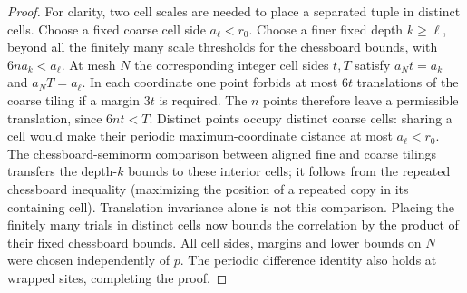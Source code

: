 \begin{proof}
For clarity, two cell scales are needed to place a separated tuple in distinct cells.
Choose a fixed coarse cell side $a_\ell<r_0$.
Choose a finer fixed depth $k\ge\ell$, beyond all the finitely many
scale thresholds for the chessboard bounds, with $6na_k<a_\ell$.
At mesh $N$ the corresponding integer cell sides $t,T$ satisfy
$a_Nt=a_k$ and $a_NT=a_\ell$.
In each coordinate one point forbids at most $6t$ translations
of the coarse tiling if a margin $3t$ is required.
The $n$ points therefore leave a permissible translation, since
$6nt<T$. Distinct points occupy distinct coarse cells: sharing
a cell would make their periodic maximum-coordinate distance
at most $a_\ell<r_0$.
The chessboard-seminorm comparison between aligned fine and coarse
tilings transfers the depth-$k$ bounds to these interior cells;
it follows from the repeated chessboard inequality (maximizing
the position of a repeated copy in its containing cell).
Translation invariance alone is not this comparison.
Placing the finitely many trials in distinct cells now bounds the correlation by
the product of their fixed chessboard bounds.
All cell sides, margins and lower bounds on $N$ were chosen independently
of $p$. The periodic difference identity also holds at wrapped
sites, completing the proof.
\end{proof}

